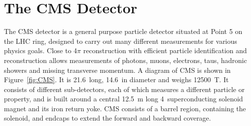 
%                       

\section{The CMS Detector}
\label{sec:CMS}

The \ac{CMS} detector is a general purpose particle detector situated at Point 5 on the \ac{LHC} ring, designed to carry out many different measurements for various physics goals.
Close to 4$\pi$ reconstruction with 
efficient particle identification and reconstruction allows measurements of photons, muons, electrons, taus, hadronic showers and missing transverse momentum.
%
A diagram of \ac{CMS} is shown in Figure~\ref{fig:CMS}. It is 21.6~\m long, 14.6~\m in diameter and weighs 12500~T. 
It consists of different sub-detectors, each of which measures a different particle or property, 
and is built around a central 12.5~m long 4~\T superconducting solenoid magnet and its iron return yoke.
%
\ac{CMS} consists of a barrel region, containing the solenoid, and endcaps to extend the forward and backward coverage.

